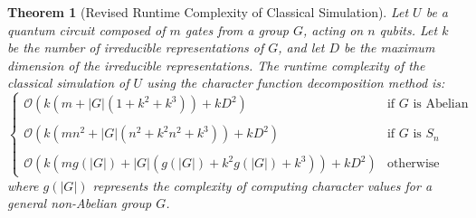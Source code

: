 \documentclass[11pt,a4paper]{article}
\newtheorem{theorem}{Theorem}
\begin{document}
\begin{theorem}[Revised Runtime Complexity of Classical Simulation]
Let $U$ be a quantum circuit composed of $m$ gates from a group $G$, acting on $n$ qubits. Let $k$ be the number of irreducible representations of $G$, and let $D$ be the maximum dimension of the irreducible representations. The runtime complexity of the classical simulation of $U$ using the character function decomposition method is:
\[
\begin{cases}
\mathcal{O}(k(m + |G|(1 + k^2 + k^3)) + kD^2) & \text{if } G \text{ is Abelian} \\ \\
\mathcal{O}(k(mn^2 + |G|(n^2 + k^2 n^2 + k^3)) + kD^2) & \text{if } G \text{ is } S_n \\ \\
\mathcal{O}(k(mg(|G|) + |G|(g(|G|) + k^2 g(|G|) + k^3)) + kD^2) & \text{otherwise}
\end{cases}
\]
where $g(|G|)$ represents the complexity of computing character values for a general non-Abelian group $G$.
\end{theorem}
\end{document}
